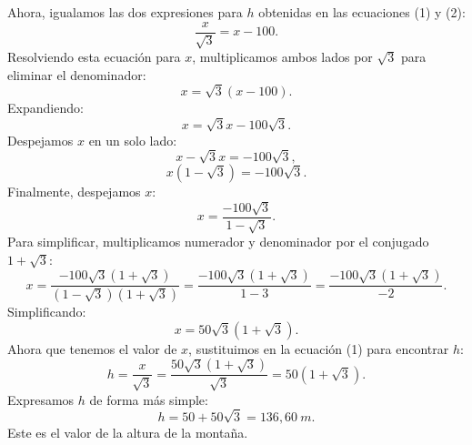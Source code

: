 \documentclass[addpoints,spanish, 12pt,a4paper]{exam}
\begin{document}
\begin{questions}
\begin{solution}
    Ahora, igualamos las dos expresiones para \( h \) obtenidas en las ecuaciones (1) y (2):
    \[
    \frac{x}{\sqrt{3}} = x - 100.
    \]
    Resolviendo esta ecuación para \( x \), multiplicamos ambos lados por \( \sqrt{3} \) para eliminar el denominador:
    \[
    x = \sqrt{3}(x - 100).
    \]
    Expandiendo:
    \[
    x = \sqrt{3}x - 100\sqrt{3}.
    \]
    Despejamos \( x \) en un solo lado:
    \[
    x - \sqrt{3}x = -100\sqrt{3},
    \]
    \[
    x(1 - \sqrt{3}) = -100\sqrt{3}.
    \]
    Finalmente, despejamos \( x \):
    \[
    x = \frac{-100\sqrt{3}}{1 - \sqrt{3}}.
    \]
    Para simplificar, multiplicamos numerador y denominador por el conjugado \( 1 + \sqrt{3} \):
    \[
    x = \frac{-100\sqrt{3}(1 + \sqrt{3})}{(1 - \sqrt{3})(1 + \sqrt{3})} = \frac{-100\sqrt{3}(1 + \sqrt{3})}{1 - 3} = \frac{-100\sqrt{3}(1 + \sqrt{3})}{-2}.
    \]
    Simplificando:
    \[
    x = 50\sqrt{3}(1 + \sqrt{3}).
    \]
    Ahora que tenemos el valor de \( x \), sustituimos en la ecuación (1) para encontrar \( h \):
    \[
    h = \frac{x}{\sqrt{3}} = \frac{50\sqrt{3}(1 + \sqrt{3})}{\sqrt{3}} = 50(1 + \sqrt{3}).
    \]
    Expresamos \( h \) de forma más simple:
    \[
    h = 50 + 50\sqrt{3}=136,60\  m.
    \]
    Este es el valor de la altura de la montaña.
\end{solution}


\addpoints
\end{questions}
\end{document}
